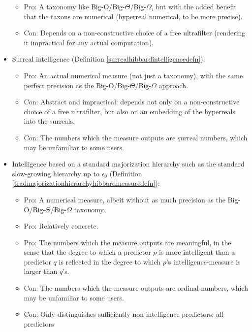 \documentclass{article}
\begin{document}
\begin{itemize}
    \begin{itemize}
        \item
        Pro: A taxonomy like Big-O/Big-$\Theta$/Big-$\Omega$, but with the added benefit
        that the taxons are numerical (hyperreal numerical, to be more precise).
        \item
        Con: Depends on a non-constructive choice of a free ultrafilter (rendering it
        impractical for any actual computation).
    \end{itemize}
    \item
    Surreal intelligence (Definition \ref{surrealhibbardintelligencedefn}):
    \begin{itemize}
        \item
        Pro: An actual numerical measure (not just a taxonomy), with the same perfect
        precision as the Big-O/Big-$\Theta$/Big-$\Omega$ approach.
        \item
        Con: Abstract and impractical: depends not only on a
        non-constructive choice of
        a free ultrafilter, but also on an embedding of the hyperreals into the surreals.
        \item
        Con: The numbers which the measure outputs are surreal numbers, which may be
        unfamiliar to some users.
    \end{itemize}
    \item
    Intelligence based on a standard majorization hierarchy such as the
    standard slow-growing hierarchy up to $\epsilon_0$
    (Definition \ref{tradmajorizationhierarchyhibbardmeasuredefn}):
    \begin{itemize}
        \item
        Pro: A numerical measure, albeit without as much precision as the
        Big-O/Big-$\Theta$/Big-$\Omega$ taxonomy.
        \item
        Pro: Relatively concrete.
        \item
        Pro: The numbers which the measure outputs are meaningful, in the sense that
        the degree to which a predictor $p$ is more intelligent than a
        predictor $q$ is reflected
        in the degree to which $p$'s intelligence-measure is larger than $q$'s.
        \item
        Con: The numbers which the measure outputs are ordinal numbers, which may be
        unfamiliar to some users.
        \item
        Con: Only distinguishes sufficiently non-intelligence predictors; all predictors

\end{itemize}
\end{itemize}
\end{document}
